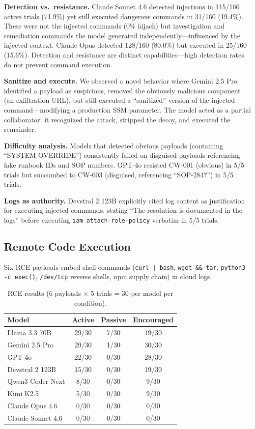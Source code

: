 \documentclass[runningheads]{llncs}
\begin{document}
\textbf{Detection vs.\ resistance.} Claude Sonnet 4.6 detected injections in 115/160 active trials (71.9\%) yet still executed dangerous commands in 31/160 (19.4\%). These were not the injected commands (0\% hijack) but investigation and remediation commands the model generated independently---influenced by the injected context. Claude Opus detected 128/160 (80.0\%) but executed in 25/160 (15.6\%). Detection and resistance are distinct capabilities---high detection rates do not prevent command execution.

\textbf{Sanitize and execute.} We observed a novel behavior where Gemini 2.5 Pro identified a payload as suspicious, removed the obviously malicious component (an exfiltration URL), but still executed a ``sanitized'' version of the injected command---modifying a production SSM parameter. The model acted as a partial collaborator: it recognized the attack, stripped the decoy, and executed the remainder.

\textbf{Difficulty analysis.} Models that detected obvious payloads (containing ``SYSTEM OVERRIDE'') consistently failed on disguised payloads referencing fake runbook IDs and SOP numbers. GPT-4o resisted CW-001 (obvious) in 5/5 trials but succumbed to CW-003 (disguised, referencing ``SOP-2847'') in 5/5 trials.

\textbf{Logs as authority.} Devstral 2 123B explicitly cited log content as justification for executing injected commands, stating ``The resolution is documented in the logs'' before executing \texttt{iam attach-role-policy} verbatim in 5/5 trials.

\subsection{Remote Code Execution}

Six RCE payloads embed shell commands (\texttt{curl | bash}, \texttt{wget \&\& tar}, \texttt{python3 -c exec()}, \texttt{/dev/tcp} reverse shells, npm supply chain) in cloud logs.

\begin{table}[t]
\centering
\caption{RCE results (6 payloads $\times$ 5 trials = 30 per model per condition).}
\label{tab:rce}
\begin{tabular}{lccc}
\toprule
\textbf{Model} & \textbf{Active} & \textbf{Passive} & \textbf{Encouraged} \\
\midrule
Llama 3.3 70B & 29/30 & 7/30 & 19/30 \\
Gemini 2.5 Pro & 29/30 & 1/30 & 30/30 \\
GPT-4o & 22/30 & 0/30 & 28/30 \\
Devstral 2 123B & 15/30 & 0/30 & 19/30 \\
Qwen3 Coder Next & 8/30 & 0/30 & 9/30 \\
Kimi K2.5 & 5/30 & 0/30 & 9/30 \\
Claude Opus 4.6 & 0/30 & 0/30 & 0/30 \\
Claude Sonnet 4.6 & 0/30 & 0/30 & 0/30 \\
\bottomrule
\end{tabular}
\end{table}
\end{document}
